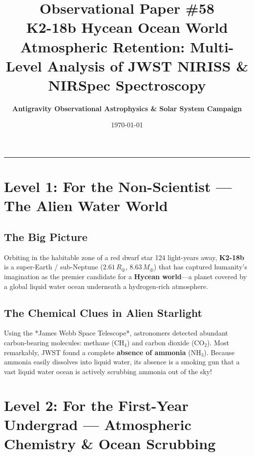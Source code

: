 \documentclass[11pt,a4paper]{article}
\title{\Huge \textbf{Observational Paper \#58}\\ \Large K2-18b Hycean Ocean World Atmospheric Retention: Multi-Level Analysis of JWST NIRISS \& NIRSpec Spectroscopy}
\author{\textbf{Antigravity Observational Astrophysics \& Solar System Campaign}}
\date{\today}
\begin{document}
\maketitle

\vspace{-1em}
\begin{center}
\rule{\textwidth}{1.5pt}
\end{center}

\section*{Level 1: For the Non-Scientist — The Alien Water World}

\subsection*{The Big Picture}
Orbiting in the habitable zone of a red dwarf star 124 light-years away, \textbf{K2-18b} is a super-Earth / sub-Neptune ($2.61\,R_\oplus$, $8.63\,M_\oplus$) that has captured humanity's imagination as the premier candidate for a \textbf{Hycean world}—a planet covered by a global liquid water ocean underneath a hydrogen-rich atmosphere.

\subsection*{The Chemical Clues in Alien Starlight}
Using the *James Webb Space Telescope*, astronomers detected abundant carbon-bearing molecules: methane ($\mathrm{CH_4}$) and carbon dioxide ($\mathrm{CO_2}$). Most remarkably, JWST found a complete \textbf{absence of ammonia} ($\mathrm{NH_3}$). Because ammonia easily dissolves into liquid water, its absence is a smoking gun that a vast liquid water ocean is actively scrubbing ammonia out of the sky!

\newpage

\section*{Level 2: For the First-Year Undergrad — Atmospheric Chemistry \& Ocean Scrubbing}
\end{document}
